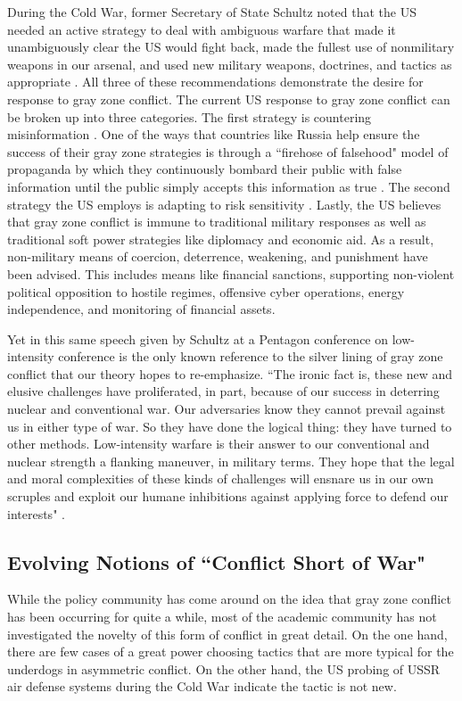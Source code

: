 \documentclass[12pt,letterpaper]{article}
\begin{document}
		During the Cold War, former Secretary of State Schultz noted that the US needed an active strategy to deal with ambiguous warfare that made it unambiguously clear the US would fight back, made the fullest use of nonmilitary weapons in our arsenal, and used new military weapons, doctrines, and tactics as appropriate \citep{schultz_lowintensitywarfarechallenge_1986}. All three of these recommendations demonstrate the desire for response to gray zone conflict. The current US response to gray zone conflict can be broken up into three categories. The first strategy is countering misinformation \citep{paul_russianfirehosefalsehood_2016}. One of the ways that countries like Russia help ensure the success of their gray zone strategies is through a ``firehose of falsehood" model of propaganda by which they continuously bombard their public with false information until the public simply accepts this information as true \citep{paul_russianfirehosefalsehood_2016}. The second strategy the US employs is adapting to risk sensitivity \citep{maxwell_grayzonesubject_2016}. Lastly, the US believes that gray zone conflict is immune to traditional military responses as well as traditional soft power strategies like diplomacy and economic aid. As a result, non-military means of coercion, deterrence, weakening, and punishment have been advised. This includes means like financial sanctions, supporting non-violent political opposition to hostile regimes, offensive cyber operations, energy independence, and monitoring of financial assets.
		
		Yet in this same speech given by Schultz at a Pentagon conference on low-intensity conference is the only known reference to the silver lining of gray zone conflict that our theory hopes to re-emphasize. ``The ironic fact is, these new and elusive challenges have proliferated, in part, because of our success in deterring nuclear and conventional war. Our adversaries know they cannot prevail against us in either type of war. So they have done the logical thing: they have turned to other methods. Low-intensity warfare is their answer to our conventional and nuclear strength a flanking maneuver, in military terms. They hope that the legal and moral complexities of these kinds of challenges will ensnare us in our own scruples and exploit our humane inhibitions against applying force to defend our interests" \citep{schultz_lowintensitywarfarechallenge_1986}.

	\subsection*{Evolving Notions of ``Conflict Short of War"}
		While the policy community has come around on the idea that gray zone conflict has been occurring for quite a while, most of the academic community has not investigated the novelty of this form of conflict in great detail. On the one hand, there are few cases of a great power choosing tactics that are more typical for the underdogs in asymmetric conflict. On the other hand, the US probing of USSR air defense systems during the Cold War indicate the tactic is not new.
		
\end{document}
